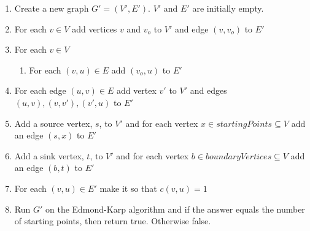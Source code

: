 \documentclass[koma,a4paper]{article}
\begin{document}
\begin{enumerate}
  \item Create a new graph $G' = (V', E')$. $V'$ and $E'$ are initially empty.
  \item For each $v \in V$ add vertices $v$ and $v_o$ to $V'$ and edge $(v, v_o)$ to $E'$
  \item For each $v \in V$
  \begin{enumerate}
    \item For each $(v, u) \in E$ add $(v_o, u)$ to $E'$
  \end{enumerate}
  \item For each edge $(u, v) \in E$ add vertex $v'$ to $V'$ and edges $(u, v), (v, v'), (v', u)$ to $E'$
  \item Add a source vertex, $s$, to $V'$ and for each vertex $x \in \mathit{startingPoints} \subseteq V$ add an edge $(s, x)$ to $E'$
  \item Add a sink vertex, $t$, to $V'$ and for each vertex $b \in \mathit{boundaryVertices} \subseteq V$ add an edge $(b, t)$ to $E'$
  \item For each $(v, u) \in E'$ make it so that $c(v, u) = 1$
  \item Run $G'$ on the Edmond-Karp algorithm and if the answer equals the number of starting points, then return true. Otherwise false.
\end{enumerate}
\end{document}

